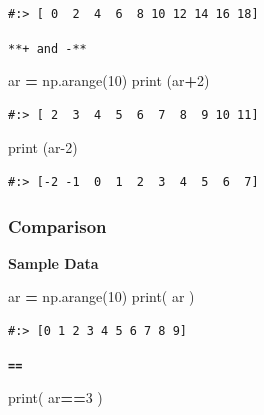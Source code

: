 \documentclass[
]{book}
\newenvironment{Shaded}{\begin{snugshade}}{\end{snugshade}}
\newcommand{\BuiltInTok}[1]{#1}
\newcommand{\DecValTok}[1]{\textcolor[rgb]{0.06,0.06,0.06}{#1}}
\newcommand{\NormalTok}[1]{#1}
\newcommand{\OperatorTok}[1]{\textcolor[rgb]{0.43,0.43,0.43}{\textbf{#1}}}
\begin{document}
\begin{verbatim}
#:> [ 0  2  4  6  8 10 12 14 16 18]
\end{verbatim}

\texttt{**+\ and\ -**}

\begin{Shaded}
\begin{Highlighting}[]
\NormalTok{ar }\OperatorTok{=}\NormalTok{ np.arange(}\DecValTok{10}\NormalTok{)}
\BuiltInTok{print}\NormalTok{ (ar}\OperatorTok{+}\DecValTok{2}\NormalTok{)}
\end{Highlighting}
\end{Shaded}

\begin{verbatim}
#:> [ 2  3  4  5  6  7  8  9 10 11]
\end{verbatim}

\begin{Shaded}
\begin{Highlighting}[]
\BuiltInTok{print}\NormalTok{ (ar}\DecValTok{-2}\NormalTok{)}
\end{Highlighting}
\end{Shaded}

\begin{verbatim}
#:> [-2 -1  0  1  2  3  4  5  6  7]
\end{verbatim}

\hypertarget{comparison}{%
\subsubsection{Comparison}\label{comparison}}

\textbf{Sample Data}

\begin{Shaded}
\begin{Highlighting}[]
\NormalTok{ar }\OperatorTok{=}\NormalTok{ np.arange(}\DecValTok{10}\NormalTok{)}
\BuiltInTok{print}\NormalTok{( ar )}
\end{Highlighting}
\end{Shaded}

\begin{verbatim}
#:> [0 1 2 3 4 5 6 7 8 9]
\end{verbatim}

\textbf{\texttt{==}}

\begin{Shaded}
\begin{Highlighting}[]
\BuiltInTok{print}\NormalTok{( ar}\OperatorTok{==}\DecValTok{3}\NormalTok{ )}
\end{Highlighting}
\end{Shaded}
\end{document}
